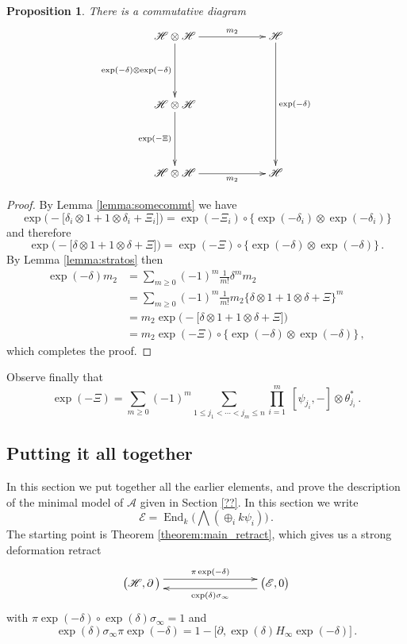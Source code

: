 \documentclass[english,letter paper,12pt,leqno]{article}
\newtheorem{proposition}[theorem]{Proposition}
\theoremstyle{example}
\numberwithin{equation}{section}
\def\be{\begin{equation}}
\def\ee{\end{equation}}
\DeclareMathOperator{\End}{End}
\begin{document}
\begin{proposition}\label{prop:adamant} There is a commutative diagram
\be
\xymatrix@C+3pc@R+2pc{
\mathscr{H} \otimes \mathscr{H} \ar[d]_-{\exp(-\delta) \otimes \exp(-\delta)} \ar[r]^-{m_2} & \mathscr{H} \ar[dd]^-{\exp(-\delta)}\\
\mathscr{H} \otimes \mathscr{H} \ar[d]_-{\exp(-\Xi)}\\
\mathscr{H} \otimes \mathscr{H} \ar[r]_-{m_2} & \mathscr{H}
}
\ee
\end{proposition}
\begin{proof}
By Lemma \ref{lemma:somecommt} we have
\[
\exp\big(-\big[ \delta_i \otimes 1 + 1 \otimes \delta_i + \Xi_i \big]\big) = \exp(-\Xi_i) \circ \big\{ \exp(-\delta_i) \otimes \exp(-\delta_i) \big\}
\]
and therefore
\[
\exp\big(-\big[ \delta \otimes 1 + 1 \otimes \delta + \Xi \big]\big) = \exp(-\Xi) \circ \big\{ \exp(-\delta) \otimes \exp(-\delta) \big\}\,.
\]
By Lemma \ref{lemma:stratos} then
\begin{align*}
\exp(-\delta) m_2 &= \sum_{m \ge 0} (-1)^m \frac{1}{m!} \delta^m m_2\\
&= \sum_{m \ge 0} (-1)^m \frac{1}{m!} m_2 \big\{ \delta \otimes 1 + 1 \otimes \delta + \Xi \big\}^m\\
&= m_2 \exp\big(-\big[ \delta \otimes 1 + 1 \otimes \delta + \Xi \big] \big)\\
&= m_2 \exp(-\Xi) \circ \big\{ \exp(-\delta) \otimes \exp(-\delta) \big\}\,,
\end{align*}
which completes the proof.
\end{proof}

Observe finally that
\be
\exp(-\Xi) = \sum_{m \ge 0} (-1)^m \sum_{1 \le j_1 < \cdots < j_m \le n} \prod_{i=1}^m \;[\psi_{j_i},-] \otimes \theta_{j_i}^*\,.
\ee

\subsection{Putting it all together}

In this section we put together all the earlier elements, and prove the description of the minimal model of $\mathscr{A}$ given in Section \ref{??}. In this section we write
\[
\mathscr{E} = \End_k\Big( \bigwedge( \oplus_i k \psi_i ) \Big)\,.
\]
The starting point is Theorem \ref{theorem:main_retract}, which gives us a strong deformation retract
\be\label{eq:ho_retract_for_mm}
\xymatrix@C+5pc{
\big( \mathscr{H}, \partial \,\big) \ar@<1ex>[r]^-{\pi\exp(-\delta)} & \big( \mathscr{E}, 0 \big) \ar@<1ex>[l]^-{ \exp(\delta)\sigma_\infty }
}
\ee
with $\pi \exp(-\delta) \circ \exp(\delta) \sigma_\infty = 1$ and
\[
\exp(\delta)\sigma_\infty \pi\exp(-\delta) = 1 - \big[ \partial, \exp(\delta) H_\infty \exp(-\delta) \big]\,.
\]
\end{document}
